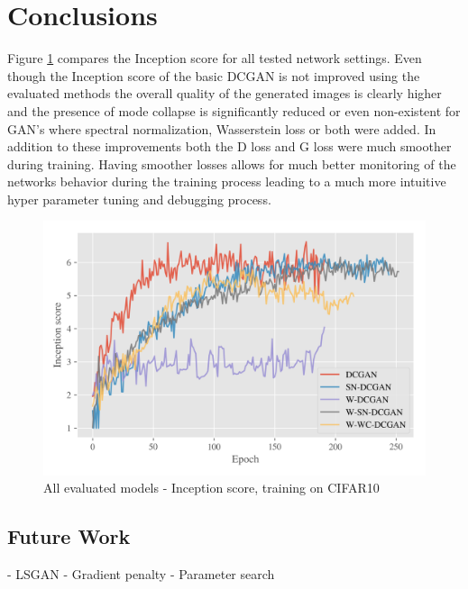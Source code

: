 
\section{Conclusions}
Figure  \ref{fig:exp-all-is} compares the Inception score for all tested network settings. Even though the Inception score of the basic DCGAN is not improved using the evaluated methods the overall quality of the generated images is clearly higher and the presence of mode collapse is significantly reduced or even non-existent for GAN's where spectral normalization, Wasserstein loss or both were added. In addition to these improvements both the D loss and G loss were much smoother during training. Having smoother losses allows for much better monitoring of the networks behavior during the training process leading to a much more intuitive hyper parameter tuning and debugging process. 
\begin{figure}[H]
\centering
\includegraphics[width=\textwidth]{../code/results/figures/all_cifar10_is.png}
\caption{All evaluated models - Inception score, training on CIFAR10}
\label{fig:exp-all-is}
\end{figure}




\subsection{Future Work}


- LSGAN
- Gradient penalty
- Parameter search
